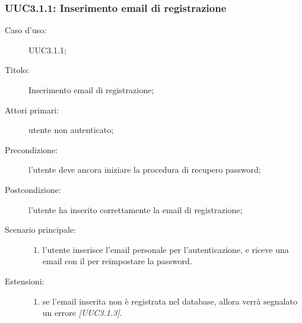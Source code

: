 \documentclass[../../../analisi-dei-requisiti.tex]{subfiles}
\begin{document}
\subsubsection{UUC3.1.1: Inserimento email di registrazione}%
\label{subs:UUC3.1.1}
\begin{description}
  \item[Caso d’uso:] UUC3.1.1;
  \item[Titolo:] Inserimento email di registrazione;
  \item[Attori primari:] utente non autenticato;
  \item[Precondizione:] l'utente deve ancora iniziare la procedura di recupero password;
  \item[Postcondizione:] l'utente ha inserito correttamente la email di registrazione;
  \item[Scenario principale:]
        \begin{enumerate}
          \item l'utente inserisce l'email personale per l'autenticazione, e riceve una email con il  per reimpostare la password.
        \end{enumerate}
  \item[Estensioni:]
        \begin{enumerate}
          \item se l'email inserita non è registrata nel database, allora verrà segnalato un errore \emph{[UUC3.1.3]}.
        \end{enumerate}
\end{description}
\end{document}
